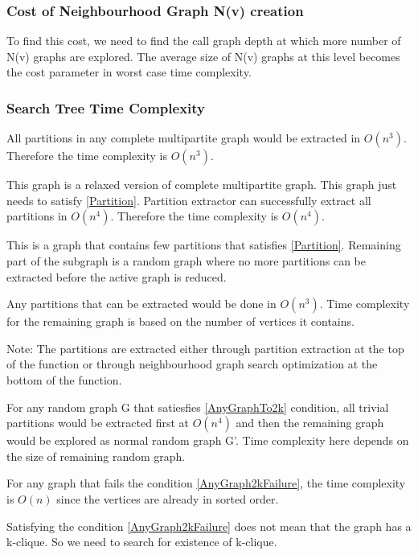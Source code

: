 \documentclass[12pt]{article}
\theoremstyle{plain}
\theoremstyle{definition}
\newcounter{subsubsubsection}[subsubsection]
\begin{document}
\subsubsection{Cost of Neighbourhood Graph N(v) creation}
To find this cost, we need to find the call graph depth at which more number of N(v) graphs are explored. The average size of N(v) graphs at this level becomes the cost parameter in worst case time complexity.

\subsubsection{Search Tree Time Complexity}

All partitions in any complete multipartite graph would be extracted in $O(n^3)$. Therefore the time complexity is $O(n^3)$.

This graph is a relaxed version of complete multipartite graph. This graph just needs to satisfy \ref{Partition}. Partition extractor can successfully extract all partitions in $O(n^4)$. Therefore the time complexity is $O(n^4)$.

This is a graph that contains few partitions that satisfies \ref{Partition}. Remaining part of the subgraph is a random graph where no more partitions can be extracted before the active graph is reduced.

Any partitions that can be extracted would be done in $O(n^3)$. Time complexity for the remaining graph is based on the number of vertices it contains.

Note: The partitions are extracted either through partition extraction at the top of the function or through neighbourhood graph search optimization at the bottom of the function.

 \label{TimeComplexityOf2kRandomGraph}
For any random graph G that satiesfies \ref{AnyGraphTo2k} condition, all trivial partitions would be extracted first at $O(n^4)$ and then the remaining graph would be explored as normal random graph G'. Time complexity here depends on the size of remaining random graph.

For any graph that fails the condition \ref{AnyGraph2kFailure}, the time complexity is $O(n)$ since the vertices are already in sorted order.

Satisfying the condition \ref{AnyGraph2kFailure} does not mean that the graph has a k-clique. So we need to search for existence of k-clique.
\end{document}
